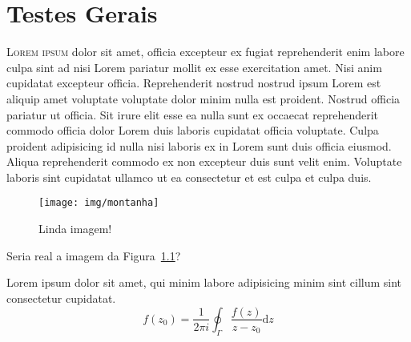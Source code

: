 \documentclass[12pt]{../libellum}
\begin{document}
 
% 
%
  \sumario
%
%
  \blinddocument
%
  \blindtext {}
% 
%
  \chapter{Testes Gerais}
   \lettrine[lines=3]{\initial\color{azulUFRB} L}{orem ipsum} dolor sit 
   amet, officia excepteur ex fugiat reprehenderit enim labore culpa sint 
   ad nisi Lorem pariatur mollit ex esse exercitation amet. 
   Nisi anim cupidatat excepteur officia. 
   Reprehenderit nostrud nostrud ipsum Lorem est aliquip amet voluptate 
   voluptate dolor minim nulla est proident. 
   Nostrud officia pariatur ut officia. 
   Sit irure elit esse ea nulla sunt ex occaecat reprehenderit commodo 
   officia dolor Lorem duis laboris cupidatat officia voluptate. 
   Culpa proident adipisicing id nulla nisi laboris ex in Lorem sunt duis 
   officia eiusmod. 
   Aliqua reprehenderit commodo ex non excepteur duis sunt velit enim. 
   Voluptate laboris sint cupidatat ullamco ut ea consectetur et est culpa 
   et culpa duis.

\begin{figure}[!htbp]
  \centering
  \texttt{[image: img/montanha]}
  \caption{Linda imagem!}
  \label{fig:montanha}
\end{figure}

Seria real a imagem da Figura~\ref{fig:montanha}?


\begin{teorema}[(de Cauchy)]\label{teste}
  Lorem ipsum dolor sit amet, qui minim labore adipisicing minim sint 
  cillum sint consectetur cupidatat.
  \[
    f(z_0) = 
    \frac{1}{2 \pi i} \oint_{\Gamma} \frac{f(z)}{z - z_0} \mathrm{d} z
  \]
\end{teorema}
\end{document}
